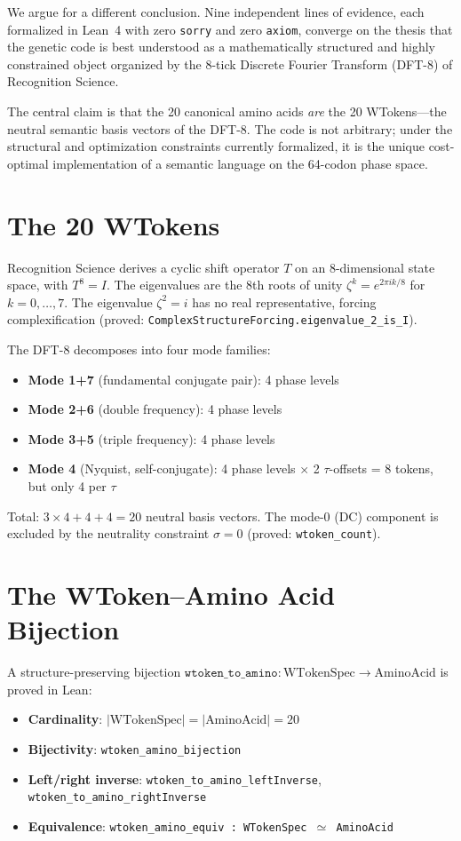 \documentclass[11pt,twocolumn]{article}
\begin{document}
We argue for a different conclusion. Nine independent lines of evidence,
each formalized in Lean~4 with zero \texttt{sorry} and zero
\texttt{axiom}, converge on the thesis that the genetic code is best
understood as a mathematically structured and highly constrained object
organized by the 8-tick Discrete Fourier Transform (DFT-8) of Recognition
Science.

The central claim is that the 20 canonical amino acids \emph{are} the 20
WTokens---the neutral semantic basis vectors of the DFT-8. The code is not
arbitrary; under the structural and optimization constraints currently
formalized, it is the unique cost-optimal implementation of a semantic
language on the 64-codon phase space.

\section{The 20 WTokens}

Recognition Science derives a cyclic shift operator $T$ on an 8-dimensional
state space, with $T^8 = I$. The eigenvalues are the 8th roots of unity
$\zeta^k = e^{2\pi i k/8}$ for $k = 0, \ldots, 7$. The eigenvalue
$\zeta^2 = i$ has no real representative, forcing complexification (proved:
\texttt{ComplexStructureForcing.eigenvalue\_2\_is\_I}).

The DFT-8 decomposes into four mode families:
\begin{itemize}
\item \textbf{Mode 1+7} (fundamental conjugate pair): 4 phase levels
\item \textbf{Mode 2+6} (double frequency): 4 phase levels
\item \textbf{Mode 3+5} (triple frequency): 4 phase levels
\item \textbf{Mode 4} (Nyquist, self-conjugate): 4 phase levels $\times$ 2 $\tau$-offsets = 8 tokens, but only 4 per $\tau$
\end{itemize}

Total: $3 \times 4 + 4 + 4 = 20$ neutral basis vectors. The mode-0 (DC)
component is excluded by the neutrality constraint $\sigma = 0$ (proved:
\texttt{wtoken\_count}).

\section{The WToken--Amino Acid Bijection}

A structure-preserving bijection $\texttt{wtoken\_to\_amino} : \text{WTokenSpec} \to \text{AminoAcid}$ is proved in Lean:
\begin{itemize}
\item \textbf{Cardinality}: $|\text{WTokenSpec}| = |\text{AminoAcid}| = 20$
\item \textbf{Bijectivity}: \texttt{wtoken\_amino\_bijection}
\item \textbf{Left/right inverse}: \texttt{wtoken\_to\_amino\_leftInverse}, \texttt{wtoken\_to\_amino\_rightInverse}
\item \textbf{Equivalence}: \texttt{wtoken\_amino\_equiv : WTokenSpec $\simeq$ AminoAcid}
\end{itemize}
\end{document}
